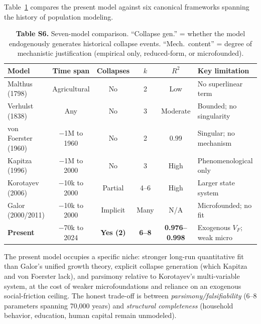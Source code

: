 \documentclass[11pt]{article}
\begin{document}
Table~\ref{tab:S6_comparison} compares the present model against six canonical frameworks
spanning the history of population modeling.

\begin{table}[htbp]
\centering
\caption{\textbf{Table S6.} Seven-model comparison. ``Collapse gen.'' = whether the model endogenously
generates historical collapse events. ``Mech.\ content'' = degree of mechanistic justification
(empirical only, reduced-form, or microfounded).}
\label{tab:S6_comparison}
\begin{tabular}{lccccl}
\toprule
Model & Time span & Collapses & $k$ & $R^2$ & Key limitation \\
\midrule
Malthus (1798) & Agricultural & No & 2 & Low & No superlinear term \\
Verhulst (1838) & Any & No & 3 & Moderate & Bounded; no singularity \\
von Foerster (1960) & $-$1M to 1960 & No & 2 & 0.99 & Singular; no mechanism \\
Kapitza (1996) & $-$1M to 2000 & No & 3 & High & Phenomenological only \\
Korotayev (2006) & $-$10k to 2000 & Partial & 4--6 & High & Larger state system \\
Galor (2000/2011) & $-$10k to 2000 & Implicit & Many & N/A & Microfounded; no fit \\
\textbf{Present} & $-$70k to 2024 & \textbf{Yes (2)} & \textbf{6--8} & \textbf{0.976--0.998} & Exogenous $V_F$; weak micro \\
\bottomrule
\end{tabular}
\end{table}

The present model occupies a specific niche: stronger long-run quantitative fit than Galor's
unified growth theory, explicit collapse generation (which Kapitza and von Foerster lack),
and parsimony relative to Korotayev's multi-variable system, at the cost of weaker
microfoundations and reliance on an exogenous social-friction ceiling.
The honest trade-off is between \emph{parsimony/falsifiability} (6--8 parameters spanning 70,000 years)
and \emph{structural completeness} (household behavior, education, human capital remain unmodeled).
\end{document}
